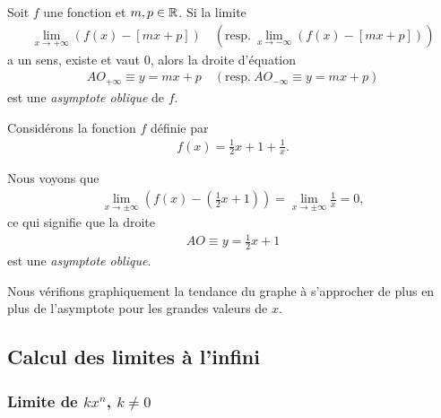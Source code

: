 \documentclass[main.tex]{subfiles}
\begin{document}
\begin{definition}

    Soit $f$ une fonction et $m, p \in \mathbb{R}$.
    Si la limite
    \begin{align*}
        \lim_{x \to +\infty} \left(f(x) - [mx + p]\right)
        \quad \left(\text{resp.}\ \lim_{x \to -\infty} \left(f(x) - [mx + p]\right)\right)
    \end{align*}
    a un sens, existe et vaut $0$,
    alors la droite d'équation
    \begin{align}
        AO_{+\infty} \equiv y = mx + p
        \quad \left(\text{resp.}\ AO_{-\infty} \equiv y = mx + p\right)
    \end{align}
    est une \emph{asymptote oblique} de $f$.
\end{definition}

\begin{example}

    Considérons la fonction $f$ définie par
    \begin{align}
        f(x) = \frac 1 2 x + 1 + \frac 1 x.
    \end{align}

    Nous voyons que
    \begin{align}
        \lim_{x \to \pm \infty} (f(x) - (\frac 1 2 x + 1)) = \lim_{x \to \pm \infty} \frac 1 x = 0,
    \end{align}
    ce qui signifie que la droite
    \begin{align}
        AO \equiv y = \frac 1 2 x + 1
    \end{align}
    est une \emph{asymptote oblique}.

    Nous vérifions graphiquement la tendance du graphe à s'approcher de plus en plus de l'asymptote pour les grandes valeurs de $x$.
    \begin{center}
        \begin{plot}{0.25}{-12}{-12}{12}{12}
        \end{plot}
    \end{center}
\end{example}

\subsection{Calcul des limites à l'infini}

\subsubsection{Limite de $k x^n$, $k \neq 0$}
\end{document}
